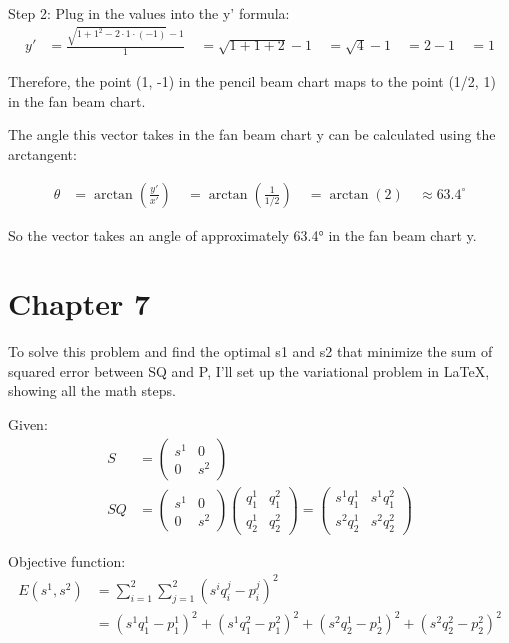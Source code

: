 \documentclass{article}
\begin{document}
Step 2: Plug in the values into the y' formula:
\begin{align*}
y' &= \frac{\sqrt{1+1^2-2 \cdot 1 \cdot (-1)}-1}{1} \
&= \sqrt{1+1+2}-1 \
&= \sqrt{4}-1 \
&= 2-1 \
&= 1
\end{align*}

Therefore, the point (1, -1) in the pencil beam chart maps to the point (1/2, 1) in the fan beam chart.

The angle this vector takes in the fan beam chart y can be calculated using the arctangent:

\begin{align*}
\theta &= \arctan(\frac{y'}{x'}) \
&= \arctan(\frac{1}{1/2}) \
&= \arctan(2) \
&\approx 63.4^\circ
\end{align*}

So the vector takes an angle of approximately 63.4° in the fan beam chart y.

\newpage
\section{Chapter 7}

To solve this problem and find the optimal s1 and s2 that minimize the sum of squared error between SQ and P, I'll set up the variational problem in LaTeX, showing all the math steps.

Given:
\begin{align*}
S &= \begin{pmatrix}
s^1 & 0\\
0 & s^2
\end{pmatrix}\\
SQ &= \begin{pmatrix}
s^1 & 0\\
0 & s^2
\end{pmatrix}
\begin{pmatrix}
q_1^1 & q_1^2\\
q_2^1 & q_2^2
\end{pmatrix} =
\begin{pmatrix}
s^1q_1^1 & s^1q_1^2\\
s^2q_2^1 & s^2q_2^2
\end{pmatrix}
\end{align*}

Objective function:
\begin{align*}
E(s^1,s^2) &= \sum_{i=1}^{2}\sum_{j=1}^{2}(s^iq_i^j - p_i^j)^2\\
&= (s^1q_1^1 - p_1^1)^2 + (s^1q_1^2 - p_1^2)^2 + (s^2q_2^1 - p_2^1)^2 + (s^2q_2^2 - p_2^2)^2
\end{align*}
\end{document}
